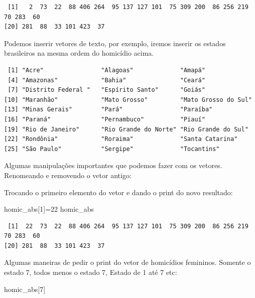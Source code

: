 \documentclass[
  letterpaper,
  DIV=11,
  numbers=noendperiod]{scrreprt}
\newenvironment{Shaded}{\begin{snugshade}}{\end{snugshade}}
\newcommand{\DecValTok}[1]{\textcolor[rgb]{0.68,0.00,0.00}{#1}}
\newcommand{\NormalTok}[1]{\textcolor[rgb]{0.00,0.23,0.31}{#1}}
\newcommand{\OtherTok}[1]{\textcolor[rgb]{0.00,0.23,0.31}{#1}}
\begin{document}
\begin{verbatim}
 [1]   2  73  22  88 406 264  95 137 127 101  75 309 200  86 256 219  70 283  60
[20] 281  88  33 101 423  37
\end{verbatim}

Podemos inserir vetores de texto, por exemplo, iremos inserir os estados
brasileiros na mesma ordem do homicídio acima.

\begin{verbatim}
 [1] "Acre"                "Alagoas"             "Amapá"              
 [4] "Amazonas"            "Bahia"               "Ceará"              
 [7] "Distrito Federal "   "Espírito Santo"      "Goiás"              
[10] "Maranhão"            "Mato Grosso"         "Mato Grosso do Sul" 
[13] "Minas Gerais"        "Pará"                "Paraíba"            
[16] "Paraná"              "Pernambuco"          "Piauí"              
[19] "Rio de Janeiro"      "Rio Grande do Norte" "Rio Grande do Sul"  
[22] "Rondônia"            "Roraima"             "Santa Catarina"     
[25] "São Paulo"           "Sergipe"             "Tocantins"          
\end{verbatim}

Algumas manipulações importantes que podemos fazer com os vetores.
Renomeando e removendo o vetor antigo:

Trocando o primeiro elemento do vetor e dando o print do novo resultado:

\begin{Shaded}
\begin{Highlighting}[]
\NormalTok{homic\_abs[}\DecValTok{1}\NormalTok{]}\OtherTok{=}\DecValTok{22}
\NormalTok{homic\_abs}
\end{Highlighting}
\end{Shaded}

\begin{verbatim}
 [1]  22  73  22  88 406 264  95 137 127 101  75 309 200  86 256 219  70 283  60
[20] 281  88  33 101 423  37
\end{verbatim}

Algumas maneiras de pedir o print do vetor de homicídios femininos.
Somente o estado 7, todos menos o estado 7, Estado de 1 até 7 etc:

\begin{Shaded}
\begin{Highlighting}[]
\NormalTok{homic\_abs[}\DecValTok{7}\NormalTok{] }
\end{Highlighting}
\end{Shaded}
\end{document}
